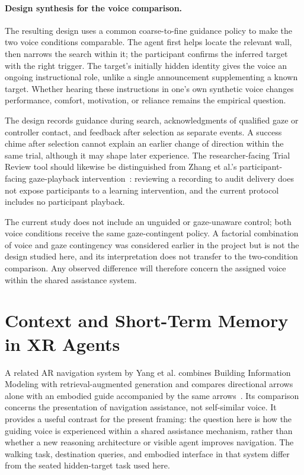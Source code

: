 \paragraph{Design synthesis for the voice comparison.}
The resulting design uses a common coarse-to-fine guidance policy to make the two voice conditions comparable. The agent first helps locate the relevant wall, then narrows the search within it; the participant confirms the inferred target with the right trigger. The target's initially hidden identity gives the voice an ongoing instructional role, unlike a single announcement supplementing a known target. Whether hearing these instructions in one's own synthetic voice changes performance, comfort, motivation, or reliance remains the empirical question.

The design records guidance during search, acknowledgments of qualified gaze or controller contact, and feedback after selection as separate events. A success chime after selection cannot explain an earlier change of direction within the same trial, although it may shape later experience. The researcher-facing Trial Review tool should likewise be distinguished from Zhang et al.'s participant-facing gaze-playback intervention~\cite{zhang2023seehear}: reviewing a recording to audit delivery does not expose participants to a learning intervention, and the current protocol includes no participant playback.

The current study does not include an unguided or gaze-unaware control; both voice conditions receive the same gaze-contingent policy. A factorial combination of voice and gaze contingency was considered earlier in the project but is not the design studied here, and its interpretation does not transfer to the two-condition comparison. Any observed difference will therefore concern the assigned voice within the shared assistance system.

\section{Context and Short-Term Memory in XR Agents}
A related AR navigation system by Yang et al. combines Building Information Modeling with retrieval-augmented generation and compares directional arrows alone with an embodied guide accompanied by the same arrows~\cite{yang2025embodiednavigation}. Its comparison concerns the presentation of navigation assistance, not self-similar voice. It provides a useful contrast for the present framing: the question here is how the guiding voice is experienced within a shared assistance mechanism, rather than whether a new reasoning architecture or visible agent improves navigation. The walking task, destination queries, and embodied interface in that system differ from the seated hidden-target task used here.

